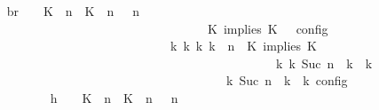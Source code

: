 \begin{isabellebody}
\ \isamarkupfalse%
\ br{}{\isacharcolon}\ {\isacartoucheopen}{\isasymrho}\ {\isasymin}\ {\isasymlbrakk}\ {\isacharparenleft}{\isacharparenleft}K\ {\isasymUp}\ n{\isacharparenright}\ {\isacharhash}\ {\isacharparenleft}K\ {\isasymUp}\ n{\isacharparenright}\ {\isacharhash}\ {\isasymGamma}{\isacharparenright}{\isacharcomma}\ n\isanewline
\ \ \ \ \ \ \ \ \ \ \ \ \ \ \ \ \ \ \ \ \ \ \ \ \ \ \ \ \ \ \ \ {\isasymturnstile}\ {\isasymPsi}\ {\isasymtriangleright}\ {\isacharparenleft}{\isacharparenleft}K\ implies\ K\ {\isacharhash}\ {\isasymPhi}{\isacharparenright}\ {\isasymrbrakk}\isactrlsub c\isactrlsub o\isactrlsub n\isactrlsub f\isactrlsub i\isactrlsub g\isanewline
\ \ \ \ \ \ \ \ \ \ \ \ \ \ \ \ \ \ \ \ \ \ \ \ \ \ \ \ {\isasymLongrightarrow}\ {\isasymexists}{\isasymGamma}\isactrlsub k\ {\isasymPsi}\isactrlsub k\ {\isasymPhi}\isactrlsub k\ k{\isachardot}\ {\isacharparenleft}{\isacharparenleft}{\isasymGamma}{\isacharcomma}\ n\ {\isasymturnstile}\ {\isacharparenleft}{\isacharparenleft}K\ implies\ K\ {\isacharhash}\ {\isasymPsi}{\isacharparenright}\ {\isasymtriangleright}\ {\isasymPhi}{\isacharparenright}\isanewline
\ \ \ \ \ \ \ \ \ \ \ \ \ \ \ \ \ \ \ \ \ \ \ \ \ \ \ \ \ \ \ \ \ \ \ \ \ \ \ \ \ \ \ \ \ \ {\isasymhookrightarrow}\isactrlbsup k\isactrlesup \ {\isacharparenleft}{\isasymGamma}\isactrlsub k{\isacharcomma}\ Suc\ n\ {\isasymturnstile}\ {\isasymPsi}\isactrlsub k\ {\isasymtriangleright}\ {\isasymPhi}\isactrlsub k{\isacharparenright}{\isacharparenright}\isanewline
\ \ \ \ \ \ \ \ \ \ \ \ \ \ \ \ \ \ \ \ \ \ \ \ \ \ \ \ \ \ \ \ \ \ {\isasymand}\ {\isasymrho}\ {\isasymin}\ {\isasymlbrakk}\ {\isasymGamma}\isactrlsub k{\isacharcomma}\ Suc\ n\ {\isasymturnstile}\ {\isasymPsi}\isactrlsub k\ {\isasymtriangleright}\ {\isasymPhi}\isactrlsub k\ {\isasymrbrakk}\isactrlsub c\isactrlsub o\isactrlsub n\isactrlsub f\isactrlsub i\isactrlsub g{\isacartoucheclose}\isanewline
\ \ \ \ \ \ \isamarkupfalse%
\ {\isacharminus}\isanewline
\ \ \ \ \ \ \ \ \isamarkupfalse%
\ h{}{\isacharcolon}\ {\isacartoucheopen}{\isasymrho}\ {\isasymin}\ {\isasymlbrakk}\ {\isacharparenleft}{\isacharparenleft}K\ {\isasymUp}\ n{\isacharparenright}\ {\isacharhash}\ {\isacharparenleft}K\ {\isasymUp}\ n{\isacharparenright}\ {\isacharhash}\ {\isasymGamma}{\isacharparenright}{\isacharcomma}\ n\isanewline

\end{isabellebody}
